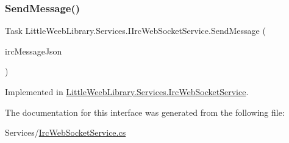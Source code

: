 \subsubsection{\texorpdfstring{Send\+Message()}{SendMessage()}}
{\footnotesize\ttfamily Task Little\+Weeb\+Library.\+Services.\+I\+Irc\+Web\+Socket\+Service.\+Send\+Message (\begin{DoxyParamCaption}\item[{J\+Object}]{irc\+Message\+Json }\end{DoxyParamCaption})}



Implemented in \mbox{\hyperlink{class_little_weeb_library_1_1_services_1_1_irc_web_socket_service_aa9fcd18dc123e1356049b4b95bbaf2ff}{Little\+Weeb\+Library.\+Services.\+Irc\+Web\+Socket\+Service}}.



The documentation for this interface was generated from the following file\+:\begin{DoxyCompactItemize}
\item 
Services/\mbox{\hyperlink{_irc_web_socket_service_8cs}{Irc\+Web\+Socket\+Service.\+cs}}\end{DoxyCompactItemize}
